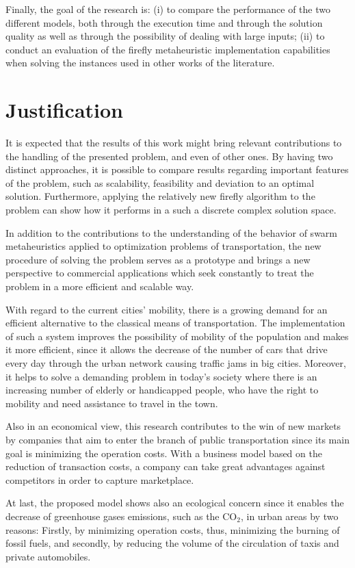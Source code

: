 \documentclass[tuberlin,cic,tc,openright,english,noabntcite,oneside]{iiufrgs}
\begin{document}
Finally, the goal of the research is: (i) to compare the performance of the two different models, both through the execution time and through the solution quality as well as through the possibility of dealing with large inputs; (ii) to conduct an evaluation of the firefly metaheuristic implementation capabilities when solving the instances used in other works of the literature.

\section{Justification}
It is expected that the results of this work might bring relevant contributions to the handling of the presented problem, and even of other ones. By having two distinct approaches, it is possible to compare results regarding important features of the problem, such as scalability, feasibility and deviation to an optimal solution. Furthermore, applying the relatively new firefly algorithm to the problem can show how it performs in a such a discrete complex solution space.

In addition to the contributions to the understanding of the behavior of swarm metaheuristics applied to optimization problems of transportation, the new procedure of solving the problem serves as a prototype and brings a new perspective to commercial applications which seek constantly to treat the problem in a more efficient and scalable way.

With regard to the current cities' mobility, there is a growing demand for an efficient alternative to the classical means of transportation. The implementation of such a system improves the possibility of mobility of the population and makes it more efficient, since it allows the decrease of the number of cars that drive every day through the urban network causing traffic jams in big cities. Moreover, it helps to solve a demanding problem in today's society where there is an increasing number of elderly or handicapped people, who have the right to mobility and need assistance to travel in the town.

Also in an economical view, this research contributes to the win of new markets by companies that aim to enter the branch of public transportation since its main goal is minimizing the operation costs. With a business model based on the reduction of transaction costs, a company can take great advantages against competitors in order to capture marketplace.

At last, the proposed model shows also an ecological concern since it enables the decrease of greenhouse gases emissions, such as the CO$_{2}$, in urban areas by two reasons: Firstly, by minimizing operation costs, thus, minimizing the burning of fossil fuels, and secondly, by reducing the volume of the circulation of taxis and private automobiles.
\end{document}
